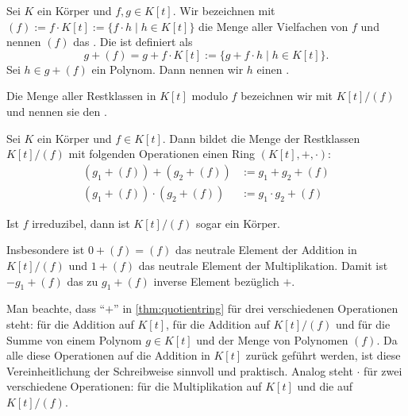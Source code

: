 \begin{definition}
Sei $K$ ein Körper und $f, g \in K[t]$. Wir bezeichnen mit $(f) := f \cdot K[t] := \{f \cdot h\mid h \in K[t]\}$ die Menge aller Vielfachen von $f$ und nennen $(f)$ das . Die  ist definiert als 
\[g + (f) = g + f \cdot K[t] := \{g + f \cdot h\mid h \in K[t]\}.\]
Sei $h \in g + (f)$ ein Polynom. Dann nennen wir $h$ einen .

Die Menge aller Restklassen in $K[t]$ modulo $f$ bezeichnen wir mit $K[t]/(f)$ und nennen sie den . 
\end{definition}

\begin{theorem}\label{thm:quotientring}
 Sei $K$ ein Körper und $f \in K[t]$. Dann bildet die Menge der Restklassen $K[t]/(f)$ mit folgenden Operationen einen Ring $(K[t], +, \cdot)$:
 \begin{align}
 (g_1 + (f)) + (g_2 + (f)) & := g_1 + g_2 + (f) \\
 (g_1 + (f)) \cdot (g_2 + (f)) & := g_1 \cdot g_2 + (f)
 \end{align}
 
 Ist $f$ irreduzibel, dann ist $K[t]/(f)$ sogar ein Körper.
\end{theorem}

\begin{remark}
 Insbesondere ist $0 + (f) = (f)$ das neutrale Element der Addition in $K[t]/(f)$ und $1 + (f)$ das neutrale Element der Multiplikation. Damit ist $-g_1 + (f)$ das zu $g_1 + (f)$ inverse Element bezüglich $+$.
\end{remark}

\begin{remark}
 Man beachte, dass \enquote{$+$} in \cref{thm:quotientring} für drei verschiedenen Operationen steht: für die Addition auf $K[t]$, für die Addition auf $K[t]/(f)$ und für die Summe von einem Polynom $g \in K[t]$ und der Menge von Polynomen $(f)$. Da alle diese Operationen auf die Addition in $K[t]$ zurück geführt werden, ist diese Vereinheitlichung der Schreibweise sinnvoll und praktisch. Analog steht $\cdot$ für zwei verschiedene Operationen: für die Multiplikation auf $K[t]$ und die auf $K[t]/(f)$.
\end{remark}

